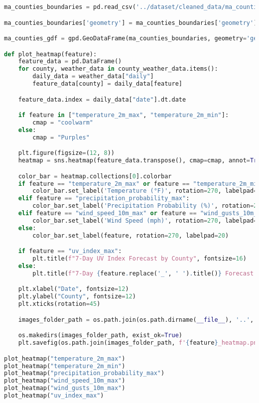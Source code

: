 \documentclass[a4paper, 12pt]{article}
\begin{document}
\begin{lstlisting}[language=Python, caption=Web Server code]
ma_counties_boundaries = pd.read_csv('../dataset/cleaned_data/ma_counties_boundaries.csv')

ma_counties_boundaries['geometry'] = ma_counties_boundaries['geometry'].apply(wkt.loads)

ma_counties_gdf = gpd.GeoDataFrame(ma_counties_boundaries, geometry='geometry')

def plot_heatmap(feature):
    feature_data = pd.DataFrame()
    for county, weather_data in county_weather_data.items():
        daily_data = weather_data["daily"]
        feature_data[county] = daily_data[feature]

    feature_data.index = daily_data["date"].dt.date

    if feature in ["temperature_2m_max", "temperature_2m_min"]:
        cmap = "coolwarm"
    else:
        cmap = "Purples"

    plt.figure(figsize=(12, 8))
    heatmap = sns.heatmap(feature_data.transpose(), cmap=cmap, annot=True, fmt=".1f", cbar=True)

    color_bar = heatmap.collections[0].colorbar
    if feature == "temperature_2m_max" or feature == "temperature_2m_min":
        color_bar.set_label('Temperature (°F)', rotation=270, labelpad=20)
    elif feature == "precipitation_probability_max":
        color_bar.set_label('Precipitation Probability (%)', rotation=270, labelpad=20)
    elif feature == "wind_speed_10m_max" or feature == "wind_gusts_10m_max":
        color_bar.set_label('Wind Speed (mph)', rotation=270, labelpad=20)
    else:
        color_bar.set_label(feature, rotation=270, labelpad=20)

    if feature == "uv_index_max":
        plt.title(f"7-Day UV Index Forecast by County", fontsize=16)
    else:
        plt.title(f"7-Day {feature.replace('_', ' ').title()} Forecast by County", fontsize=16)

    plt.xlabel("Date", fontsize=12)
    plt.ylabel("County", fontsize=12)
    plt.xticks(rotation=45)

    images_folder_path = os.path.join(os.path.dirname(__file__), '..', 'Frontend', 'static', 'images')

    os.makedirs(images_folder_path, exist_ok=True)
    plt.savefig(os.path.join(images_folder_path, f'{feature}_heatmap.png'), bbox_inches='tight')

plot_heatmap("temperature_2m_max")
plot_heatmap("temperature_2m_min")
plot_heatmap("precipitation_probability_max")
plot_heatmap("wind_speed_10m_max")
plot_heatmap("wind_gusts_10m_max")
plot_heatmap("uv_index_max")


\end{lstlisting}
\end{document}
